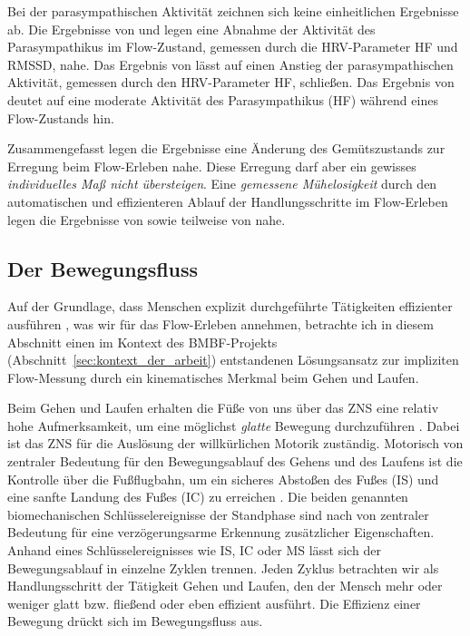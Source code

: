 Bei der parasympathischen Aktivität zeichnen sich keine einheitlichen Ergebnisse ab. Die Ergebnisse von \citet{deManzano2010} und \citet{Keller2011} legen eine Abnahme der Aktivität des Parasympathikus im Flow-Zustand, gemessen durch die \ac{HRV}-Parameter \acs{HF} und \acs{RMSSD}, nahe. Das Ergebnis von \citet{Peifer2014} lässt auf einen Anstieg der parasympathischen Aktivität, gemessen durch den \ac{HRV}-Parameter \acs{HF}, schließen. Das Ergebnis von \citet{Tozman2015} deutet auf eine moderate Aktivität des Parasympathikus (\acs{HF}) während eines Flow-Zustands hin.

Zusammengefasst legen die Ergebnisse eine Änderung des Gemütszustands zur Erregung beim Flow-Erleben nahe. Diese Erregung darf aber ein gewisses \emph{individuelles Maß nicht übersteigen}. Eine \emph{gemessene Mühelosigkeit} durch den automatischen und effizienteren Ablauf der Handlungsschritte im Flow-Erleben legen die Ergebnisse von \citet{Peifer2014} sowie teilweise von \citet{Tozman2015, Harmat2015} nahe.

\subsection{Der Bewegungsfluss} 

\label{ssub:der_bewegungsfluss}

Auf der Grundlage, dass Menschen explizit durchgeführte Tätigkeiten effizienter ausführen \citep[][S.~753]{Dietrich2004}, was wir für das Flow-Erleben annehmen, betrachte ich in diesem Abschnitt einen im Kontext des \acs{BMBF}-Projekts (Abschnitt~\ref{sec:kontext_der_arbeit}) entstandenen Lösungsansatz zur impliziten Flow-Messung durch ein kinematisches Merkmal beim Gehen und Laufen.

Beim Gehen und Laufen erhalten die Füße von uns über das \acs{ZNS} eine relativ hohe Aufmerksamkeit, um eine möglichst \emph{glatte} Bewegung durchzuführen \citep[][S.~193]{Brooks1986}. Dabei ist das \acs{ZNS} für die Auslösung der willkürlichen Motorik zuständig. Motorisch von zentraler Bedeutung für den Bewegungsablauf des Gehens und des Laufens ist die Kontrolle über die Fußflugbahn, um ein sicheres Abstoßen des Fußes (\ac{IS}) und eine sanfte Landung des Fußes (\ac{IC}) zu erreichen \citep[][S.~197]{Winter1989}. Die beiden genannten biomechanischen Schlüsselereignisse der Standphase sind nach \citet{Aminian2002, Lee2011} von zentraler Bedeutung für eine verzögerungsarme Erkennung zusätzlicher Eigenschaften. Anhand eines Schlüsselereignisses wie \ac{IS}, \ac{IC} oder \ac{MS} lässt sich der Bewegungsablauf in einzelne Zyklen trennen. Jeden Zyklus betrachten wir als Handlungsschritt der Tätigkeit Gehen und Laufen, den der Mensch mehr oder weniger glatt bzw. fließend oder eben effizient ausführt. Die Effizienz einer Bewegung drückt sich im Bewegungsfluss aus. 

